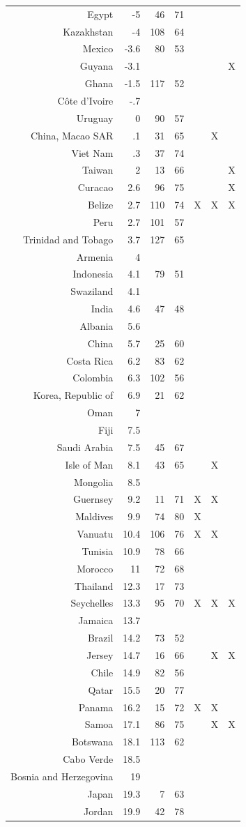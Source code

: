\begin{tabular}{rrrrrrr}
Egypt&-5&46&71&&&\\
Kazakhstan&-4&108&64&&&\\
Mexico&-3.6&80&53&&&\\
Guyana&-3.1&&&&&X\\
Ghana&-1.5&117&52&&&\\
C\^{o}te d'Ivoire&-.7&&&&&\\
Uruguay&0&90&57&&&\\
China, Macao SAR&.1&31&65&&X&\\
Viet Nam&.3&37&74&&&\\
Taiwan&2&13&66&&&X\\
Curacao&2.6&96&75&&&X\\
Belize&2.7&110&74&X&X&X\\
Peru&2.7&101&57&&&\\
Trinidad and Tobago&3.7&127&65&&&\\
Armenia&4&&&&&\\
Indonesia&4.1&79&51&&&\\
Swaziland&4.1&&&&&\\
India&4.6&47&48&&&\\
Albania&5.6&&&&&\\
China&5.7&25&60&&&\\
Costa Rica&6.2&83&62&&&\\
Colombia&6.3&102&56&&&\\
Korea, Republic of&6.9&21&62&&&\\
Oman&7&&&&&\\
Fiji&7.5&&&&&\\
Saudi Arabia&7.5&45&67&&&\\
Isle of Man&8.1&43&65&&X&\\
Mongolia&8.5&&&&&\\
Guernsey&9.2&11&71&X&X&\\
Maldives&9.9&74&80&X&&\\
Vanuatu&10.4&106&76&X&X&\\
Tunisia&10.9&78&66&&&\\
Morocco&11&72&68&&&\\
Thailand&12.3&17&73&&&\\
Seychelles&13.3&95&70&X&X&X\\
Jamaica&13.7&&&&&\\
Brazil&14.2&73&52&&&\\
Jersey&14.7&16&66&&X&X\\
Chile&14.9&82&56&&&\\
Qatar&15.5&20&77&&&\\
Panama&16.2&15&72&X&X&\\
Samoa&17.1&86&75&&X&X\\
Botswana&18.1&113&62&&&\\
Cabo Verde&18.5&&&&&\\
Bosnia and Herzegovina&19&&&&&\\
Japan&19.3&7&63&&&\\
Jordan&19.9&42&78&&&\\
\bottomrule
\end{tabular}
